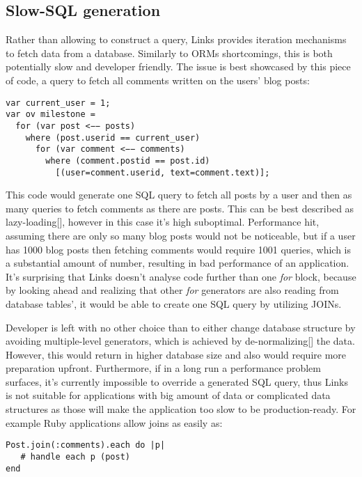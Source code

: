 \subsection{Slow-SQL generation}

Rather than allowing to construct a query, Links provides iteration mechanisms to fetch data from a database. Similarly to ORMs shortcomings, this is both potentially slow and developer friendly. The issue is best showcased by this piece of code, a query to fetch all comments written on the users' blog posts:

\begin{codelisting}
\begin{verbatim}
var current_user = 1;
var ov milestone =
  for (var post <−− posts)
    where (post.userid == current_user)
      for (var comment <−− comments)
        where (comment.postid == post.id)
          [(user=comment.userid, text=comment.text)];
\end{verbatim}
\end{codelisting}

This code would generate one SQL query to fetch all posts by a user and then as many queries to fetch comments as there are posts. This can be best described as lazy-loading[], however in this case it's high suboptimal. Performance hit, assuming there are only so many blog posts would not be noticeable, but if a user has 1000 blog posts then fetching comments would require 1001 queries, which is a substantial amount of number, resulting in bad performance of an application. It's surprising that Links doesn't analyse code further than one \textit{for} block, because by looking ahead and realizing that other \textit{for} generators are also reading from database tables', it would be able to create one SQL query by utilizing JOINs. 

Developer is left with no other choice than to either change database structure by avoiding multiple-level generators, which is achieved by de-normalizing[] the data. However, this would return in higher database size and also would require more preparation upfront. Furthermore, if in a long run a performance problem surfaces, it's currently impossible to override a generated SQL query, thus Links is not suitable for applications with big amount of data or complicated data structures as those will make the application too slow to be production-ready. For example Ruby applications allow joins as easily as:

\begin{codelisting}
\begin{verbatim}
Post.join(:comments).each do |p|
   # handle each p (post)
end
\end{verbatim}
\end{codelisting}


